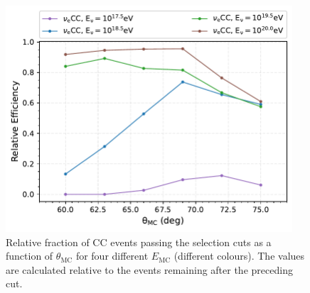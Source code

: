 \begin{figure}[ht!]
  \centering
  \includegraphics[width=0.95\textwidth]{thesis_figures/Nu_analysis/Nu_eff/Rel_efficencies_theta_E_CC_wnt_redcut.pdf}
  \caption{Relative fraction of CC events passing the selection cuts as a function of $\theta_{\text{MC}}$ for four different $E_{\text{MC}}$ (different colours). The values are calculated relative to the events remaining after the preceding cut.}
  \label{fig:Eff_v_theta_CC_E}
\end{figure}

